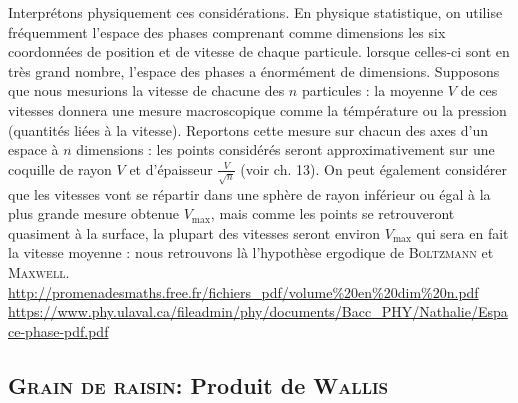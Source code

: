 
\begin{remarque}
Interprétons physiquement ces considérations. En physique statistique, on utilise fréquemment l'espace des phases comprenant comme dimensions les six coordonnées de position et de vitesse de chaque particule. lorsque celles-ci sont en très grand nombre, l'espace des phases a énormément de dimensions. Supposons que nous mesurions la vitesse de chacune des $n$ particules : la moyenne $V$ de ces vitesses donnera une mesure macroscopique comme la témpérature ou la pression (quantités liées à la vitesse). Reportons cette mesure sur chacun des axes d'un espace à $n$ dimensions : les points considérés seront approximativement sur une coquille de rayon $V$ et d'épaisseur $\frac{V}{\sqrt{n}}$ (voir ch. 13). On peut également considérer que les vitesses vont se répartir dans une sphère de rayon inférieur ou égal à la plus grande mesure obtenue $V_\mathrm{max}$, mais comme les points se retrouveront quasiment à la surface, la plupart des vitesses seront environ $V_\mathrm{max}$ qui sera en fait la vitesse moyenne : nous retrouvons là l'hypothèse ergodique de \textsc{Boltzmann} et \textsc{Maxwell}. \url{http://promenadesmaths.free.fr/fichiers_pdf/volume%20en%20dim%20n.pdf} \url{https://www.phy.ulaval.ca/fileadmin/phy/documents/Bacc_PHY/Nathalie/Espace-phase-pdf.pdf}
\end{remarque}




\subsection{\textsc{Grain de raisin}: Produit de \textsc{Wallis}}


